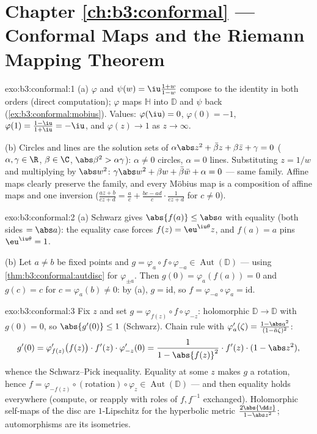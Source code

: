 \section*{Chapter \ref{ch:b3:conformal} --- Conformal Maps and
the Riemann Mapping Theorem}

\begin{solution}{exo:b3:conformal:1}
(a) $\varphi$ and $\psi(w) = \iu\frac{1+w}{1-w}$ compose to
the identity in both orders (direct computation); $\varphi$
maps $\mathbb H$ into $\mathbb D$ and $\psi$ back
(\cref{ex:b3:conformal:mobius}). Values: $\varphi(\iu) = 0$,
$\varphi(0) = -1$, $\varphi(1) = \frac{1 - \iu}{1 + \iu} =
-\iu$, and $\varphi(z) \to 1$ as $z \to \infty$.

(b) Circles and lines are the solution sets of
$\alpha\abs z^2 + \bar\beta z + \beta\bar z + \gamma = 0$
($\alpha, \gamma \in \R$, $\beta \in \C$, $\abs\beta^2 >
\alpha\gamma$): $\alpha \neq 0$ circles, $\alpha = 0$ lines.
Substituting $z = 1/w$ and multiplying by $\abs w^2$:
$\gamma\abs w^2 + \beta w + \bar\beta\bar w + \alpha = 0$ ---
same family. Affine maps clearly preserve the family, and
every M\"obius map is a composition of affine maps and one
inversion ($\frac{az+b}{cz+d} = \frac ac + \frac{bc -
ad}{c}\cdot\frac1{cz + d}$ for $c \neq 0$).
\end{solution}

\begin{solution}{exo:b3:conformal:2}
(a) Schwarz gives $\abs{f(a)} \leq \abs a$ with equality (both
sides $= \abs a$): the equality case forces $f(z) =
\eu^{\iu\theta}z$, and $f(a) = a$ pins $\eu^{\iu\theta} = 1$.

(b) Let $a \neq b$ be fixed points and $g =
\varphi_a\circ f\circ\varphi_{-a} \in
\operatorname{Aut}(\mathbb D)$ --- using
\cref{thm:b3:conformal:autdisc} for $\varphi_{\pm a}$. Then
$g(0) = \varphi_a(f(a)) = 0$ and $g(c) = c$ for $c =
\varphi_a(b) \neq 0$: by (a), $g = \mathrm{id}$, so $f =
\varphi_{-a}\circ\varphi_a = \mathrm{id}$.
\end{solution}

\begin{solution}{exo:b3:conformal:3}
Fix $z$ and set $g = \varphi_{f(z)}\circ f\circ\varphi_{-z}$:
holomorphic $\mathbb D \to \mathbb D$ with $g(0) = 0$, so
$\abs{g'(0)} \leq 1$ (Schwarz). Chain rule with
$\varphi_a'(\zeta) = \frac{1 - \abs a^2}{(1 - \bar
a\zeta)^2}$:
\[
g'(0) = \varphi_{f(z)}'\bigl(f(z)\bigr)\cdot f'(z)\cdot
\varphi_{-z}'(0)
= \frac{1}{1 - \abs{f(z)}^2}\cdot f'(z)\cdot(1 - \abs z^2),
\]
whence the Schwarz--Pick inequality. Equality at some $z$
makes $g$ a rotation, hence $f =
\varphi_{-f(z)}\circ(\text{rotation})\circ\varphi_z \in
\operatorname{Aut}(\mathbb D)$ --- and then equality holds
everywhere (compute, or reapply with roles of $f, f^{-1}$
exchanged). Holomorphic self-maps of the disc are
$1$-Lipschitz for the hyperbolic metric $\frac{2\abs{\dd
z}}{1 - \abs z^2}$; automorphisms are its isometries.
\end{solution}

